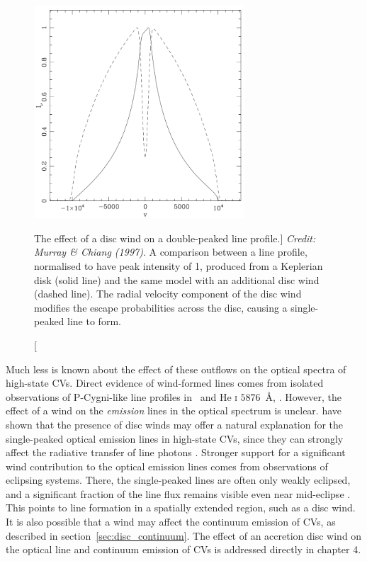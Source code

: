 \begin{figure}
\centering
\includegraphics[width=0.7\textwidth]{figures/02-outflows/mc_line.png}
\caption
[The effect of a disc wind on a double-peaked line profile.]
{
{\sl Credit: Murray \& Chiang (1997)}. 
A comparison between a line profile, normalised to have peak intensity of 1,
produced from a Keplerian disk (solid line) and the same model with an additional
disc wind (dashed line). The radial velocity component of the disc wind modifies
the escape probabilities across the disc, causing a single-peaked line to form.
} 
\label{fig:mc_line}
\end{figure}

Much less is known about the effect of these outflows on the optical
spectra of high-state CVs. Direct evidence of wind-formed lines comes from
isolated observations of P-Cygni-like line profiles in
\ha\ and He \textsc{i} $5876$~\AA, 
\citep{patterson1996, RN98, kafka2004}. 
However, the effect of a wind  on the {\em emission} lines in the optical
spectrum is unclear.
\cite{MC96, MC97} have shown that the presence of disc winds may
offer a natural explanation for the single-peaked optical emission lines in
high-state CVs, since they can strongly affect the radiative transfer
of line photons \citep[Fig.~\ref{fig:mc_line}; also see][]{flohic2012}. 
Stronger support for a significant wind contribution to the
optical emission lines comes from observations of eclipsing
systems. There, the single-peaked lines are often only weakly
eclipsed, and a significant fraction of the line flux remains visible
even near mid-eclipse \citep[e.g.][]{baptista2000,groot2004}. 
This points to line formation in a spatially
extended region, such as a disc wind.
It is also possible that a wind may affect the continuum emission of CVs,
as described in section~\ref{sec:disc_continuum}. 
The effect of an accretion disc wind
on the optical line and continuum emission of CVs is addressed directly
in chapter 4.

